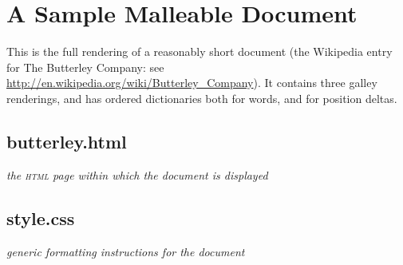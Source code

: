 

%


\cleardoublepage
\chapter{A Sample Malleable Document}
\label{app:sampledoc}

This is the full rendering of a reasonably short document (the Wikipedia entry for The Butterley Company: see \url{http://en.wikipedia.org/wiki/Butterley_Company}). It contains three galley renderings, and has ordered dictionaries both for words, and for position deltas.

\section{butterley.html}
\emph{the \textsc{html} page within which the document is displayed}
%

\section{style.css}
\emph{generic formatting instructions for the document}
%
\newpage

